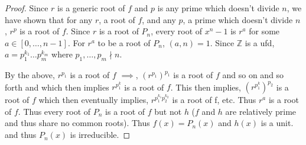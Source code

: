 \documentclass{article}
\newcommand{\Z}{\mathbb{Z}}
\begin{document}
\begin{proof}
    Since $r$ is a generic root of $f$ and $p$ is any prime which doesn't divide $n$, we have shown that for any $r$, a root of $f$, and any $p$, a prime which doesn't divide $n$, $r^p$ is a root of $f$. Since $r$ is a root of $P_n$, every root of $x^n - 1$ is $r^a$ for some $a \in [0, \dots, n - 1]$. For $r^a$ to be a root of $P_n$, $(a, n) = 1$. Since $\Z$ is a ufd, $a = p_1^{k_1}\dots p_m^{k_m}$ where $p_1, \dots, p_m \nmid n$. 
    
    By the above, $r^{p_1}$ is a root of $f$ $\implies $, $(r^{p_1})^{p_1}$ is a root of $f$ and so on and so forth and which then implies $r^{p_1^k}$ is a root of $f$. This then implies, $(r^{p_1^k})^{p_2}$ is a root of $f$ which then eventually implies, $r^{p_1^{k_1} p_2^{k_2}}$ is a root of f, etc. Thus $r^a$ is a root of $f$. Thus every root of $P_n$ is a root of $f$ but not $h$ ($f$ and $h$ are relatively prime and thus share no common roots). Thus $f(x) = P_n(x)$ and $h(x)$ is a unit. and thus $P_n(x)$ is irreducible.                      
\end{proof}
\end{document}
